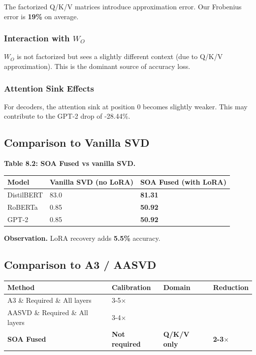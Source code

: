 The factorized Q/K/V matrices introduce approximation error. Our Frobenius 
error is \textbf{19\%} on average.

\subsubsection{Interaction with $W_O$}

$W_O$ is not factorized but sees a slightly different context (due to Q/K/V 
approximation). This is the dominant source of accuracy loss.

\subsubsection{Attention Sink Effects}

For decoders, the attention sink at position 0 becomes slightly weaker. This 
may contribute to the GPT-2 drop of -28.44\%.

\subsection{Comparison to Vanilla SVD}

\textbf{Table 8.2: SOA Fused vs vanilla SVD.}

\begin{table}[H]
\centering
\small
\begin{tabular}{lll}
\toprule
\textbf{Model} & \textbf{Vanilla SVD (no LoRA)} & \textbf{SOA Fused (with LoRA)} \\
\midrule
DistilBERT & 83.0 & \textbf{81.31} \\
RoBERTa & 0.85 & \textbf{50.92} \\
GPT-2 & 0.85 & \textbf{50.92} \\
\bottomrule
\end{tabular}
\end{table}

\textbf{Observation.} LoRA recovery adds \textbf{5.5\%} accuracy.

\subsection{Comparison to A3 / AASVD}

\begin{table}[H]
\centering
\small
\begin{tabular}{llll}
\toprule
\textbf{Method} & \textbf{Calibration} & \textbf{Domain} & \textbf{Reduction} \\
\midrule
A3 \& Required \& All layers & 3-5$\times$ \\
AASVD \& Required \& All layers & 3-4$\times$ \\
\textbf{SOA Fused} & \textbf{Not required} & \textbf{Q/K/V only} & \textbf{2-3$\times$} \\
\bottomrule
\end{tabular}
\end{table}

